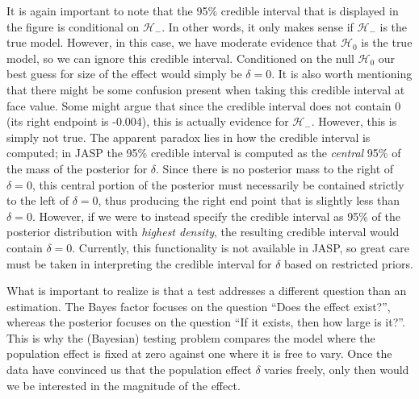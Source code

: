 \documentclass[english,,doc,floatsintext]{apa6}
\begin{document}
It is again important to note that the 95\% credible interval that is displayed in the figure is conditional on \(\mathcal{H}_{-}\). In other words, it only makes sense if \(\mathcal{H}_{-}\) is the true model. However, in this case, we have moderate evidence that \(\mathcal{H}_{0}\) is the true model, so we can ignore this credible interval. Conditioned on the null \(\mathcal{H}_{0}\) our best guess for size of the effect would simply be \(\delta = 0\). It is also worth mentioning that there might be some confusion present when taking this credible interval at face value. Some might argue that since the credible interval does not contain 0 (its right endpoint is -0.004), this is actually evidence for \(\mathcal{H}_{-}\). However, this is simply not true. The apparent paradox lies in how the credible interval is computed; in JASP the 95\% credible interval is computed as the \emph{central} 95\% of the mass of the posterior for \(\delta\). Since there is no posterior mass to the right of \(\delta=0\), this central portion of the posterior must necessarily be contained strictly to the left of \(\delta=0\), thus producing the right end point that is slightly less than \(\delta=0\). However, if we were to instead specify the credible interval as 95\% of the posterior distribution with \emph{highest density}, the resulting credible interval would contain \(\delta=0\). Currently, this functionality is not available in JASP, so great care must be taken in interpreting the credible interval for \(\delta\) based on restricted priors.

What is important to realize is that a test addresses a different question than an estimation. The Bayes factor focuses on the question \enquote{Does the effect exist?}, whereas the posterior focuses on the question \enquote{If it exists, then how large is it?}. This is why the (Bayesian) testing problem compares the model where the population effect is fixed at zero against one where it is free to vary. Once the data have convinced us that the population effect \(\delta\) varies freely, only then would we be interested in the magnitude of the effect.
\end{document}
